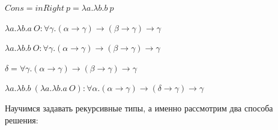 $Cons = inRight\ p = \lambda a. \lambda b. b\ p$

$\lambda a. \lambda b. a\ O : \forall \gamma .(\alpha \rightarrow \gamma) \rightarrow (\beta \rightarrow \gamma) \rightarrow \gamma$

$\lambda a. \lambda b. b\ O: \forall \gamma .(\alpha \rightarrow \gamma) \rightarrow (\beta \rightarrow \gamma) \rightarrow \gamma$

$\delta = \forall \gamma .(\alpha \rightarrow \gamma) \rightarrow (\beta \rightarrow \gamma) \rightarrow \gamma$

$\lambda a. \lambda b. b\ (\lambda a. \lambda b. a\ O) : \forall \alpha. (\alpha \rightarrow \gamma) \rightarrow (\delta \rightarrow \gamma) \rightarrow \gamma$


\vspace{5mm}
Научимся задавать рекурсивные типы, а именно рассмотрим два способа решения:

